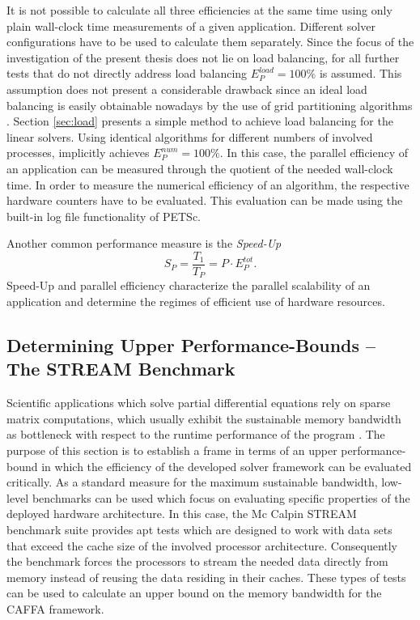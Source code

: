 It is not possible to calculate all three efficiencies at the same time using only plain wall-clock time measurements of a given application.  Different solver configurations have to be used to calculate them separately. Since the focus of the investigation of the present thesis does not lie on load balancing, for all further tests that do not directly address load balancing \(E^{load}_P = 100\%  \) is assumed. This assumption does not present a considerable drawback since an ideal load balancing is easily obtainable nowadays by the use of grid partitioning algorithms \cite{ferziger02}. Section \ref{sec:load} presents a simple method to achieve load balancing for the linear solvers. Using identical algorithms for different numbers of involved processes, implicitly achieves \(E^{num}_P = 100 \%\). In this case, the parallel efficiency of an application can be measured through the quotient of the needed wall-clock time. In order to measure the numerical efficiency of an algorithm, the respective hardware counters have to be evaluated. This evaluation can be made using the built-in log file functionality of PETSc. 

Another common performance measure is the \emph{Speed-Up}
\begin{displaymath}
  S_P = \frac{T_1}{T_P} = P \cdot E^{tot}_P.
\end{displaymath}
Speed-Up and parallel efficiency characterize the parallel scalability of an application and determine the regimes of efficient use of hardware resources.

\subsection{Determining Upper Performance-Bounds -- The STREAM Benchmark}

Scientific applications which solve partial differential equations rely on sparse matrix computations, which usually exhibit the sustainable memory bandwidth as bottleneck with respect to the runtime performance of the program \cite{hager11}. The purpose of this section is to establish a frame in terms of an upper performance-bound in which the efficiency of the developed solver framework can be evaluated critically. As a standard measure for the maximum sustainable bandwidth, low-level benchmarks can be used which focus on evaluating specific properties of the deployed hardware architecture. In this case, the Mc Calpin STREAM benchmark suite \cite{mccalpin07,mccalpin95} provides apt tests which are designed to work with data sets that exceed the cache size of the involved processor architecture. Consequently the benchmark forces the processors to stream the needed data directly from memory instead of reusing the data residing in their caches. These types of tests can be used to calculate an upper bound on the memory bandwidth for the CAFFA framework.

